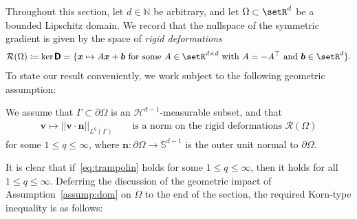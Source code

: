 \documentclass[reqno,a4paper]{amsart}
\def\norm#1{\left|\!\left| #1 \right|\!\right|}
\def\tens#1{\pmb{\mathsf{#1}}}
\def\vec#1{\boldsymbol{#1}}
\def\bb{\vec{b}}
\def\bn{\vec{n}}
\def\bv{\vec{v}}
\def\bx{\vec{x}}
\def\BD{\tens{D}}
\begin{document}
	 Throughout this section, let $d\in\mathbb{N}$ be arbitrary, and let $\Omega \subset \setR^d$ be a bounded Lipschitz domain. 
	We record that the nullspace of the symmetric gradient is given by the space of \emph{rigid deformations} 
	\begin{align*}
		\mathcal{R}(\Omega) \coloneqq \operatorname{ker} \BD =  
		\{\bx \mapsto A\bx + \bb \text{ for some } A \in \setR^{d \times d} \text{ with } A = -A^\top \text{ and } \bb \in \setR^d \}. 
	\end{align*} 
	To state our result conveniently, we work subject to the following geometric assumption: 
	\begin{assumption}\label{assump:dom}
		We assume that  $\Gamma\subset\partial\Omega$ is an $\mathcal{H}^{d-1}$-measurable subset, and that 
		\begin{align}\label{eq:trampolin}
			\bv \mapsto \norm{\bv \cdot \bn}_{L^q(\Gamma)}\qquad \text{is a norm on the  rigid deformations $\mathcal{R}(\Omega)$}
		\end{align}
		for some $1\leq q \leq \infty$, where $\bn\colon\partial\Omega\to\mathbb{S}^{d-1}$ is the outer unit normal to $\partial\Omega$. 
	\end{assumption}
	It is clear that if~\eqref{eq:trampolin} holds for some $1\leq q\leq\infty$, then it holds for all $1\leq q\leq \infty$. 
	Deferring the discussion of the geometric impact of Assumption~\ref{assump:dom} on $\Omega$ to the end of the section, the required Korn-type inequality is as follows: 
	
\end{document}
